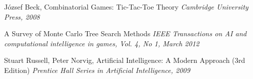 \begin{thebibliography}{9}


József Beck, Combinatorial Games: Tic-Tac-Toe Theory
\emph{Cambridge University Press, 2008}

A Survey of Monte Carlo Tree Search Methods
\emph{IEEE Transactions on AI and computational intelligence in games, Vol. 4, No 1, March 2012}


Stuart Russell, Peter Norvig, Artificial Intelligence: A Modern Approach (3rd Edition) 
\emph{Prentice Hall Series in Artificial Intelligence, 2009}


\end{thebibliography}
